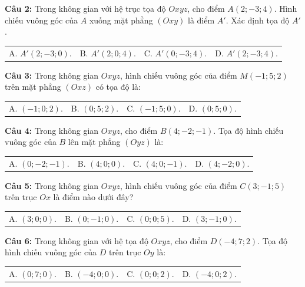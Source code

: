 \documentclass[12pt]{article}
\begin{document}
	\vspace{2mm}
	\noindent \textbf{Câu 2:} Trong không gian với hệ trục tọa độ $Oxyz$, cho điểm $A(2; -3; 4)$. Hình chiếu vuông góc của $A$ xuống mặt phẳng $(Oxy)$ là điểm $A'$. Xác định tọa độ $A'$. \\
	\noindent
	\begin{tabular}{p{} p{} p{} p{}}
		A. $A'(2; -3; 0)$. & B. $A'(2; 0; 4)$. & C. $A'(0; -3; 4)$. & D. $A'(2; -3; 4)$.
	\end{tabular}
	
	\vspace{2mm}
	\noindent \textbf{Câu 3:} Trong không gian $Oxyz$, hình chiếu vuông góc của điểm $M(-1; 5; 2)$ trên mặt phẳng $(Oxz)$ có tọa độ là: \\
	\noindent
	\begin{tabular}{p{} p{} p{} p{}}
		A. $(-1; 0; 2)$. & B. $(0; 5; 2)$. & C. $(-1; 5; 0)$. & D. $(0; 5; 0)$.
	\end{tabular}
	
	\vspace{2mm}
	\noindent \textbf{Câu 4:} Trong không gian $Oxyz$, cho điểm $B(4; -2; -1)$. Tọa độ hình chiếu vuông góc của $B$ lên mặt phẳng $(Oyz)$ là: \\
	\noindent
	\begin{tabular}{p{} p{} p{} p{}}
		A. $(0; -2; -1)$. & B. $(4; 0; 0)$. & C. $(4; 0; -1)$. & D. $(4; -2; 0)$.
	\end{tabular}
	
	\vspace{2mm}
	\noindent \textbf{Câu 5:} Trong không gian $Oxyz$, hình chiếu vuông góc của điểm $C(3; -1; 5)$ trên trục $Ox$ là điểm nào dưới đây? \\
	\noindent
	\begin{tabular}{p{} p{} p{} p{}}
		A. $(3; 0; 0)$. & B. $(0; -1; 0)$. & C. $(0; 0; 5)$. & D. $(3; -1; 0)$.
	\end{tabular}
	
	\vspace{2mm}
	\noindent \textbf{Câu 6:} Trong không gian với hệ tọa độ $Oxyz$, cho điểm $D(-4; 7; 2)$. Tọa độ hình chiếu vuông góc của $D$ trên trục $Oy$ là: \\
	\noindent
	\begin{tabular}{p{} p{} p{} p{}}
		A. $(0; 7; 0)$. & B. $(-4; 0; 0)$. & C. $(0; 0; 2)$. & D. $(-4; 0; 2)$.
	\end{tabular}
	
\end{document}
